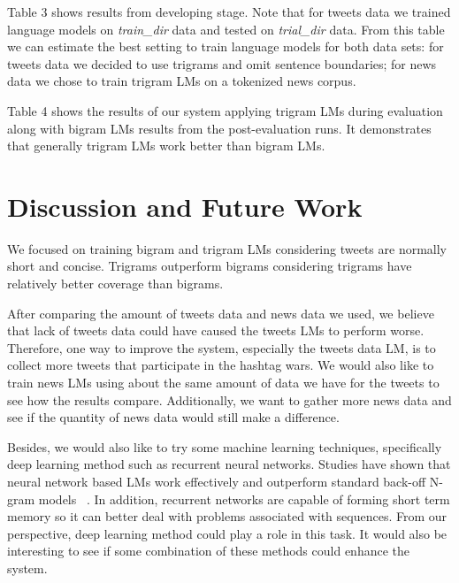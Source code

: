 \documentclass[11pt,a4paper]{article}
\begin{document}
Table 3 shows results from developing stage. Note that for tweets data we trained language models on \textit{train\_dir} data and tested on \textit{trial\_dir} data. From this table we can estimate the best setting to train language models for both data sets: for tweets data we decided to use trigrams and omit sentence boundaries; for news data we chose to train trigram LMs on a tokenized news corpus.

Table 4 shows the results of our system applying trigram LMs during evaluation along with bigram LMs results from the post-evaluation runs. It demonstrates that generally trigram LMs work better than bigram LMs.


\section{Discussion and Future Work}
We focused on training bigram and trigram LMs considering tweets are normally short and concise. Trigrams outperform bigrams considering trigrams have relatively better coverage than bigrams. 

After comparing the amount of tweets data and news data we used, we believe that lack of tweets data could have caused the tweets LMs to perform worse. Therefore, one way to improve the system, especially the tweets data LM, is to collect more tweets that participate in the hashtag wars. We would also like to train news LMs using about the same amount of data we have for the tweets to see how the results compare. Additionally, we want to gather more news data and see if the quantity of news data would still make a difference. 

Besides, we would also like to try some machine learning techniques, specifically deep learning method such as recurrent neural networks. Studies have shown that neural network based LMs work effectively and outperform standard back-off N-gram models ~\cite{mikolov2011extensions}. In addition, recurrent networks are capable of forming short term memory so it can better deal with problems associated with sequences. From our perspective, deep learning method could play a role in this task. It would also be interesting to see if some combination of these methods could enhance the system.




%
%


\end{document}
